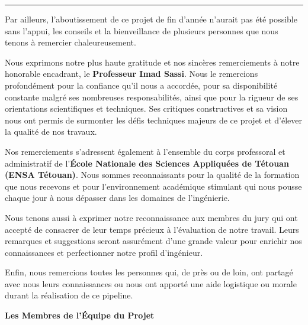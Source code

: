 \documentclass[12pt,a4paper]{report}
\begin{document}
\vspace{0.3cm}
\noindent\rule{\textwidth}{0.5pt}
\vspace{0.3cm}

\noindent Par ailleurs, l'aboutissement de ce projet de fin d'année n'aurait pas été possible sans l'appui, les conseils et la bienveillance de plusieurs personnes que nous tenons à remercier chaleureusement.

\vspace{0.3cm}

\noindent Nous exprimons notre plus haute gratitude et nos sincères remerciements à notre honorable encadrant, le \textbf{Professeur Imad Sassi}. Nous le remercions profondément pour la confiance qu'il nous a accordée, pour sa disponibilité constante malgré ses nombreuses responsabilités, ainsi que pour la rigueur de ses orientations scientifiques et techniques. Ses critiques constructives et sa vision nous ont permis de surmonter les défis techniques majeurs de ce projet et d'élever la qualité de nos travaux.

\vspace{0.3cm}

\noindent Nos remerciements s'adressent également à l'ensemble du corps professoral et administratif de l'\textbf{École Nationale des Sciences Appliquées de Tétouan (ENSA Tétouan)}. Nous sommes reconnaissants pour la qualité de la formation que nous recevons et pour l'environnement académique stimulant qui nous pousse chaque jour à nous dépasser dans les domaines de l'ingénierie.

\vspace{0.3cm}

\noindent Nous tenons aussi à exprimer notre reconnaissance aux membres du jury qui ont accepté de consacrer de leur temps précieux à l'évaluation de notre travail. Leurs remarques et suggestions seront assurément d'une grande valeur pour enrichir nos connaissances et perfectionner notre profil d'ingénieur.

\vspace{0.3cm}

\noindent Enfin, nous remercions toutes les personnes qui, de près ou de loin, ont partagé avec nous leurs connaissances ou nous ont apporté une aide logistique ou morale durant la réalisation de ce pipeline.

\vspace{1cm}

\begin{flushright}
\textbf{Les Membres de l'Équipe du Projet}
\end{flushright}
\newpage
\tableofcontents
\newpage
\end{document}
